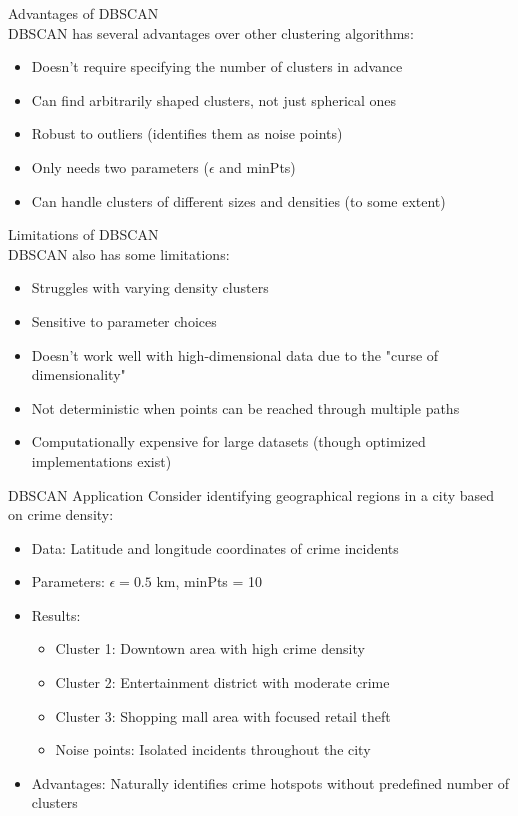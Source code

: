 \begin{concept}{Advantages of DBSCAN}\\
DBSCAN has several advantages over other clustering algorithms:
\begin{itemize}
    \item Doesn't require specifying the number of clusters in advance
    \item Can find arbitrarily shaped clusters, not just spherical ones
    \item Robust to outliers (identifies them as noise points)
    \item Only needs two parameters ($\epsilon$ and minPts)
    \item Can handle clusters of different sizes and densities (to some extent)
\end{itemize}
\end{concept}

\begin{concept}{Limitations of DBSCAN}\\
DBSCAN also has some limitations:
\begin{itemize}
    \item Struggles with varying density clusters
    \item Sensitive to parameter choices
    \item Doesn't work well with high-dimensional data due to the "curse of dimensionality"
    \item Not deterministic when points can be reached through multiple paths
    \item Computationally expensive for large datasets (though optimized implementations exist)
\end{itemize}
\end{concept}

\begin{example}{DBSCAN Application}
Consider identifying geographical regions in a city based on crime density:
\begin{itemize}
    \item Data: Latitude and longitude coordinates of crime incidents
    \item Parameters: $\epsilon = 0.5$ km, minPts = 10
    \item Results:
    \begin{itemize}
        \item Cluster 1: Downtown area with high crime density
        \item Cluster 2: Entertainment district with moderate crime
        \item Cluster 3: Shopping mall area with focused retail theft
        \item Noise points: Isolated incidents throughout the city
    \end{itemize}
    \item Advantages: Naturally identifies crime hotspots without predefined number of clusters
\end{itemize}
\end{example}

